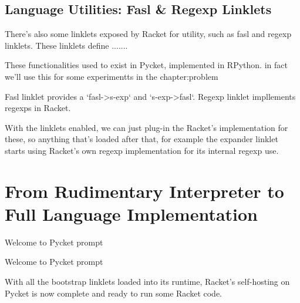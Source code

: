 		\subsection{Language Utilities: Fasl \& Regexp Linklets}

			\begin{paragraph-here}%
				There's also some linklets exposed by Racket for utility, such as fasl and regexp linklets. These linklets define .......
			\end{paragraph-here}

			\begin{paragraph-here}%
				These functionalities used to exist in Pycket, implemented in RPython. in fact we'll use this for some experimentts in the chapter:problem
			\end{paragraph-here}

			\begin{paragraph-here}%
				Fasl linklet provides a `fasl->s-exp` and `s-exp->fasl`. Regexp linklet impllements regexps in Racket.
			\end{paragraph-here}

			\begin{paragraph-here}%
				With the linklets enabled, we can just plug-in the Racket's implementation for these, so anything that's loaded after that, for example the expander linklet starts using Racket's own regexp implementation for its internal regexp use.
			\end{paragraph-here}



	\section[\texorpdfstring{From Rudimentary Interpreter to Full Language Implementation}{Pycket as Full Racket}]{From Rudimentary Interpreter to Full Language Implementation}

		\begin{figure-here}
			Welcome to Pycket prompt

			\begin{todo}
				Welcome to Pycket prompt
			\end{todo}
		\end{figure-here}

		\begin{paragraph-here}%
			With all the bootstrap linklets loaded into its runtime, Racket's self-hosting on Pycket is now complete and ready to run some Racket code.
		\end{paragraph-here}

